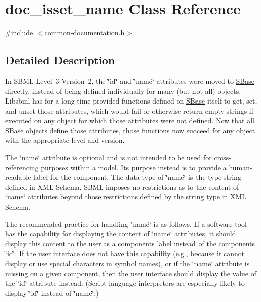\hypertarget{classdoc__isset__name}{}\section{doc\+\_\+isset\+\_\+name Class Reference}
\label{classdoc__isset__name}


{\ttfamily \#include $<$common-\/documentation.\+h$>$}



\subsection{Detailed Description}
\begin{DoxyParagraph}{}
In S\+B\+ML Level~3 Version~2, the \char`\"{}id\char`\"{} and \char`\"{}name\char`\"{} attributes were moved to \hyperlink{class_s_base}{S\+Base} directly, instead of being defined individually for many (but not all) objects. Libsbml has for a long time provided functions defined on \hyperlink{class_s_base}{S\+Base} itself to get, set, and unset those attributes, which would fail or otherwise return empty strings if executed on any object for which those attributes were not defined. Now that all \hyperlink{class_s_base}{S\+Base} objects define those attributes, those functions now succeed for any object with the appropriate level and version.
\end{DoxyParagraph}
The \char`\"{}name\char`\"{} attribute is optional and is not intended to be used for cross-\/referencing purposes within a model. Its purpose instead is to provide a human-\/readable label for the component. The data type of \char`\"{}name\char`\"{} is the type {\ttfamily string} defined in X\+ML Schema. S\+B\+ML imposes no restrictions as to the content of \char`\"{}name\char`\"{} attributes beyond those restrictions defined by the {\ttfamily string} type in X\+ML Schema.

The recommended practice for handling \char`\"{}name\char`\"{} is as follows. If a software tool has the capability for displaying the content of \char`\"{}name\char`\"{} attributes, it should display this content to the user as a component\textquotesingle{}s label instead of the component\textquotesingle{}s \char`\"{}id\char`\"{}. If the user interface does not have this capability (e.\+g., because it cannot display or use special characters in symbol names), or if the \char`\"{}name\char`\"{} attribute is missing on a given component, then the user interface should display the value of the \char`\"{}id\char`\"{} attribute instead. (Script language interpreters are especially likely to display \char`\"{}id\char`\"{} instead of \char`\"{}name\char`\"{}.)

